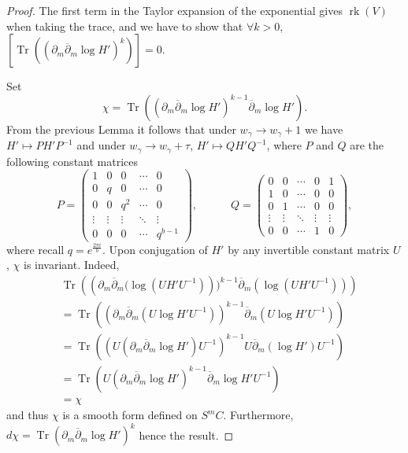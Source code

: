 \documentclass{article}
\theoremstyle{definition}
\DeclareMathOperator{\rk}{rk}
\DeclareMathOperator{\tr}{Tr}
\newcommand{\ov}[1]{\overline{#1}}
\begin{document}
\begin{proof}
The first term in the Taylor expansion of the exponential gives $\rk(V)$ when taking the trace, and we have to show that $\forall k>0$, $[\tr \left( (\partial_m \ov{\partial}_m \log H')^k\right)]=0$.

Set $$\chi=\tr \left( \left(\partial_m \ov{\partial}_m \log H'\right)^{k-1} \ov{\partial}_m \log H' \right).$$ 
From the previous Lemma it follows that
under $w_\gamma \to w_\gamma+1$ we have $H' \mapsto PH'P^{-1}$ and under $w_\gamma \to w_\gamma+\tau$, $H' \mapsto QH'Q^{-1}$, where $P$ and $Q$ are the following constant matrices
\[
P=
\begin{pmatrix}
1 & 0 & 0 & \cdots & 0 \\
0 & q & 0 & \cdots & 0 \\
0 & 0 & q^2 & \cdots & 0 \\
\vdots & \vdots & \vdots & \ddots & \vdots \\
0 & 0 & 0 & \cdots & q^{b-1}
\end{pmatrix},\quad\quad\quad Q= 
\begin{pmatrix}
0 & 0 & \cdots & 0 & 1 \\
1 & 0 & \cdots & 0 & 0 \\
0 & 1 & \cdots & 0 & 0 \\
\vdots & \vdots & \ddots & \vdots & \vdots \\
0 & 0 & \cdots & 1 & 0
\end{pmatrix},
\]
where recall $q=e^{\frac{2\pi i}{b}}$.
Upon conjugation of $H'$ by any invertible constant matrix $U$, $\chi$ is invariant. Indeed,
\begin{align*}
    &\tr \left( \left(\partial_m \ov{\partial}_m (\log (UH'U^{-1})\right))^{k-1} \ov{\partial}_m (\log (UH'U^{-1}))\right)\\
    &=\tr \left( \left(\partial_m \ov{\partial}_m (U\log H'U^{-1})\right)^{k-1} \ov{\partial}_m (U\log H'U^{-1})\right)\\
    &=\tr \left(  \left(U(\partial_m \ov{\partial}_m \log H' )U^{-1}\right)^{k-1} U\ov{\partial}_m (\log H')U^{-1}\right)\\
    &=\tr \left( U \left(\partial_m \ov{\partial}_m \log H' \right)^{k-1} \ov{\partial}_m \log H' U^{-1}\right)\\
    &=\chi
\end{align*} and thus $\chi$ is a smooth form defined on $S^m C$. Furthermore, $d\chi=\tr \left(\partial_m \ov{\partial}_m \log H'\right)^k$ hence the result.

\end{proof}
\end{document}
